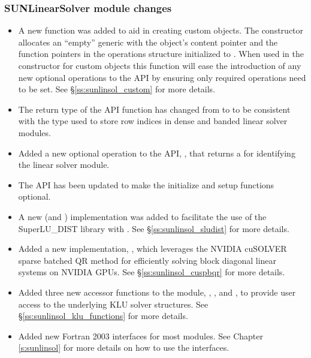 \subsubsection*{SUNLinearSolver module changes}

\begin{itemize}
\item A new function was added to aid in creating custom {\sunlinsol} objects.
The constructor  allocates an ``empty'' generic
{\sunlinsol} with the object's content pointer and the function pointers
in the operations structure initialized to . When used in the
constructor for custom objects this function will ease the introduction of any
new optional operations to the {\sunlinsol} API by ensuring only required
operations need to be set. See \S\ref{ss:sunlinsol_custom} for more details.
%
\item The return type of the {\sunlinsol} API function 
has changed from  to  to be consistent with the
type used to store row indices in dense and banded linear solver modules.
%
\item Added a new optional operation to the {\sunlinsol} API,
, that returns a \newline\noindent
{} for identifying the
linear solver module.
%
\item The {\sunlinsol} API has been updated to make the initialize and setup
functions optional.
%
\item A new {\sunlinsol} (and {\sunmatrix}) implementation was added to
facilitate the use of the SuperLU\_DIST library with {\sundials}. See
\S\ref{ss:sunlinsol_sludist} for more details.
%
\item Added a new {\sunlinsol} implementation,
, which leverages the NVIDIA cuSOLVER
sparse batched QR method for efficiently solving block diagonal linear systems
on NVIDIA GPUs. See \S\ref{ss:sunlinsol_cuspbqr} for more details.
%
\item Added three new accessor functions to the {\sunlinsolklu} module,
,
, and
,
to provide user access to the underlying KLU solver structures. See
\S\ref{ss:sunlinsol_klu_functions} for more details.
%
\item Added new Fortran 2003 interfaces for most {\sunlinsol} modules. See
Chapter \ref{s:sunlinsol} for more details on how to use the interfaces.
\end{itemize}


